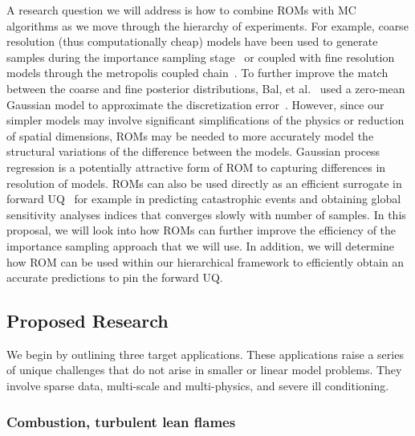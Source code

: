 \documentclass[11pt]{article}
\newcommand{\MarginPar}[1]{\marginpar{%
\vskip-\baselineskip %
\raggedright\tiny\sffamily
\hrule\smallskip{\color{red}#1}\par\smallskip\hrule}}
\begin{document}
A research question we will address is how to combine ROMs with MC algorithms as we move through the hierarchy of experiments.
For example, coarse resolution (thus computationally cheap) models have been used to generate  samples
during the importance sampling stage~\cite{Higdon:2002vx,Christen:2005wp,Efendiev:2007uw,Bal:2013tp} or
coupled with fine resolution models through the metropolis coupled chain~\cite{Higdon:2002vx}.
To further improve the match between the coarse and fine posterior distributions, Bal, et al.~\cite{Bal:2013tp} used
a zero-mean Gaussian model to approximate the discretization error~\cite{Kaipio:2007ux}.
However, since our simpler models may involve significant simplifications of the physics or reduction of spatial dimensions,
ROMs may be needed to more accurately model the structural variations of the difference between the models. 
Gaussian process regression is a potentially attractive form of ROM to capturing differences in resolution of models.  
ROMs can also be used directly as an efficient surrogate in forward UQ~\cite{Challenor:2012uv, Ratto:2012tf} for example in predicting catastrophic events and obtaining global sensitivity analyses indices that converges slowly with number of samples.   In this proposal, we will look into how ROMs can further improve the efficiency of the importance sampling approach that we will use.  In addition, we will determine how ROM can be used within our hierarchical framework to efficiently obtain an accurate predictions to pin the forward UQ.\MarginPar{RG: huh?}


\subsection*{Proposed Research}

We begin by outlining three target applications.
These applications raise a series of unique challenges that do not arise in smaller or linear
model problems.
They involve sparse data, multi-scale and multi-physics, and severe ill conditioning.

\subsubsection*{Combustion, turbulent lean flames}
\MarginPar{MSD: Rewrote this section}
\end{document}
